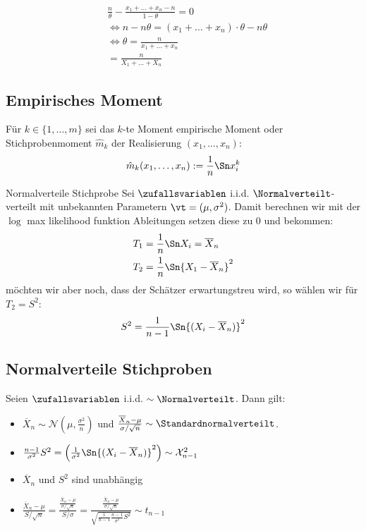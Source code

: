 \begin{align*}
   & \frac{n}{\theta} - \frac{x_1 + \ldots + x_n - n}{1 - \theta} = 0               \\
   & \Longleftrightarrow n - n\theta =  (x_1 + \ldots + x_n) \cdot \theta - n\theta \\
   & \Longleftrightarrow \theta = \frac{n}{x_1 + \ldots + x_n}                      \\
   & = \frac{n}{X_1 + \ldots + X_n}
\end{align*}

\BoxEnd{}
\subsection{Empirisches Moment}
Für $k \in \{1, \dots, m\}$ sei das $k$-te Moment empirische Moment oder
Stichprobenmoment $\hat{m}_k$ der Realisierung $ (x_1, \dots, x_n)$:
\begin{align*}
  \hat{m}_k (x_1, \dots, x_n) := \frac{1}{n} \Sn x_i^k
\end{align*}

\begin{definition}{Normalverteile Stichprobe}
Sei $\zufallsvariablen$ i.i.d. $\Normalverteilt$-verteilt mit unbekannten
Parametern $\vt = (\mu, \sigma^2)$. Damit berechnen wir mit der $\log$ max
likelihood funktion Ableitungen setzen diese zu $0$ und bekommen:
\begin{align*}
  T_1 & = \frac{1}{n} \Sn X_i = \overline{X}_n     \\
  T_2 & = \frac{1}{n} \Sn {X_1 - \overline{X}_n}^2
\end{align*}
möchten wir aber noch, dass der Schätzer erwartungstreu wird,
so wählen wir für $T_2 = S^2$:
\begin{align*}
  S^2 = \frac{1}{n-1} \Sn  {(X_i - \overline{X}_n)}^2
\end{align*}
\end{definition}
\subsection{Normalverteile Stichproben}
Seien $\zufallsvariablen$ i.i.d. $\sim \Normalverteilt$. Dann gilt:
\begin{itemize}
  \item $\overline{X}_n \sim \mathcal{N} (\mu, \frac{\sigma^2}{n})$
        und $\frac{\overline{X}_n - \mu}{\sigma / \sqrt{n}} \sim \Standardnormalverteilt$.
  \item $\frac{n-1}{\sigma^2} S^2 = \left( \frac{1}{\sigma^2} \Sn  {(X_i - \overline{X}_n)}^2 \right) \sim \mathcal{X}^2_{n-1}$
  \item $\overline{X}_n$ und $S^2$ sind unabhängig
  \item $\frac{\overline{X}_n - \mu}{S / \sqrt{n}} = \frac{ \frac{\overline{X}_n - \mu}{\sigma / \sqrt{n}} }{S / \sigma} = \frac{ \frac{\overline{X}_n - \mu}{\sigma / \sqrt{n}} }{\sqrt{\frac{1}{n-1} \frac{n-1}{\sigma^2} S^2}} \sim t_{n-1}$
\end{itemize}
